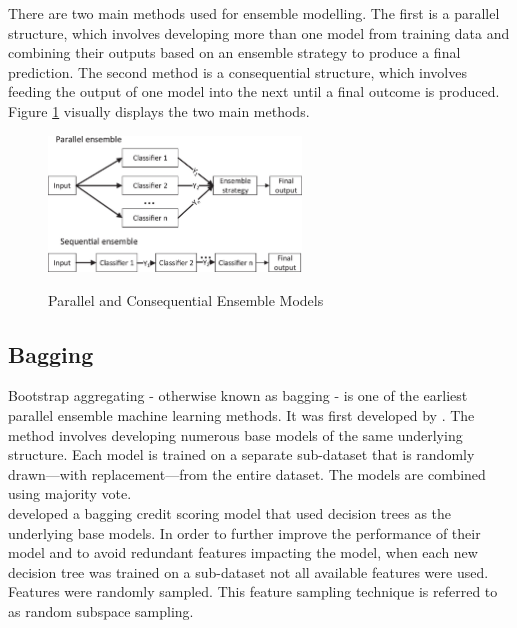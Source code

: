 There are two main methods used for ensemble modelling. The first is a parallel structure, which involves developing more than one model from training data and combining their outputs based on an ensemble strategy to produce a final prediction. The second method is a consequential structure, which involves feeding the output of one model into the next until a final outcome is produced. Figure \ref{fig:ensemble} visually displays the two main methods. 

\vspace{10pt}

\begin{figure}[!htb]
\centering
\includegraphics[width=0.6\textwidth]{images/ensemble.jpg}
\caption{Parallel and Consequential Ensemble Models}
\parencite{Ensemble}
\label{fig:ensemble}
\end{figure}

\vspace{10pt}

\subsection{Bagging}

Bootstrap aggregating - otherwise known as bagging - is one of the earliest parallel ensemble machine learning methods. It was first developed by \textcite{BagBri}. The method involves developing numerous base models of the same underlying structure. Each model is trained on a separate sub-dataset that is randomly drawn—with replacement—from the entire dataset. The models are combined using majority vote. \\

\textcite{BagWang} developed a bagging credit scoring model that used decision trees as the underlying base models. In order to further improve the performance of their model and to avoid redundant features impacting the model, when each new decision tree was trained on a sub-dataset not all available features were used. Features were randomly sampled. This feature sampling technique is referred to as random subspace sampling. \\

